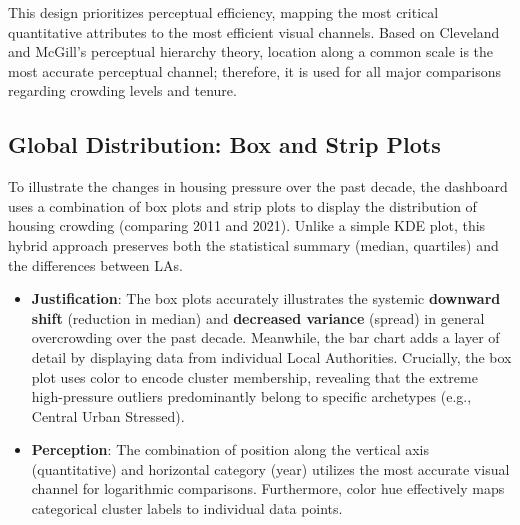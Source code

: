 \documentclass[conference]{IEEEtran}
\begin{document}
This design prioritizes perceptual efficiency, mapping the most critical quantitative attributes to the most efficient visual channels. Based on Cleveland and McGill's perceptual hierarchy theory, location along a common scale is the most accurate perceptual channel; therefore, it is used for all major comparisons regarding crowding levels and tenure\cite{cleveland_graphical_1984}.

\subsection{Global Distribution: Box and Strip Plots}
To illustrate the changes in housing pressure over the past decade, the dashboard uses a combination of box plots and strip plots to display the distribution of housing crowding (comparing 2011 and 2021). Unlike a simple KDE plot, this hybrid approach preserves both the statistical summary (median, quartiles) and the differences between LAs.
\begin{itemize}
    \item \textbf{Justification}: The box plots accurately illustrates the systemic \textbf{downward shift} (reduction in median) and \textbf{decreased variance} (spread) in general overcrowding over the past decade. Meanwhile, the bar chart adds a layer of detail by displaying data from individual Local Authorities. Crucially, the box plot uses color to encode cluster membership, revealing that the extreme high-pressure outliers predominantly belong to specific archetypes (e.g., Central Urban Stressed).
    \item \textbf{Perception}: The combination of position along the vertical axis (quantitative) and horizontal category (year) utilizes the most accurate visual channel for logarithmic comparisons. Furthermore, color hue effectively maps categorical cluster labels to individual data points.
\end{itemize}
\end{document}

